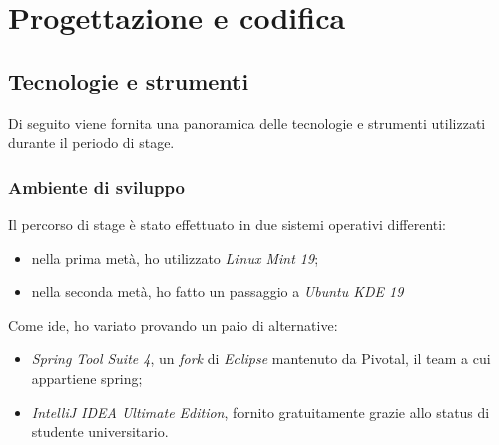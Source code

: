
\chapter{Progettazione e codifica}
\label{cap:progettazione-codifica}


\section{Tecnologie e strumenti}
\label{sec:tecnologie-strumenti}

Di seguito viene fornita una panoramica delle tecnologie e strumenti utilizzati durante il periodo di stage.


\subsection{Ambiente di sviluppo}
Il percorso di stage è stato effettuato in due sistemi operativi differenti:
\begin{itemize}
	\item nella prima metà, ho utilizzato \textit{Linux Mint 19};
	\item nella seconda metà, ho fatto un passaggio a \textit{Ubuntu KDE 19}
\end{itemize}

Come \acrshort{ide}, ho variato provando un paio di alternative:
\begin{itemize}
	\item \textit{Spring Tool Suite 4}, un \textit{fork} di \textit{Eclipse} mantenuto da Pivotal, il team a cui appartiene \gls{spring};
	\item \textit{IntelliJ IDEA Ultimate Edition}, fornito gratuitamente grazie allo status di studente universitario.
\end{itemize} 

